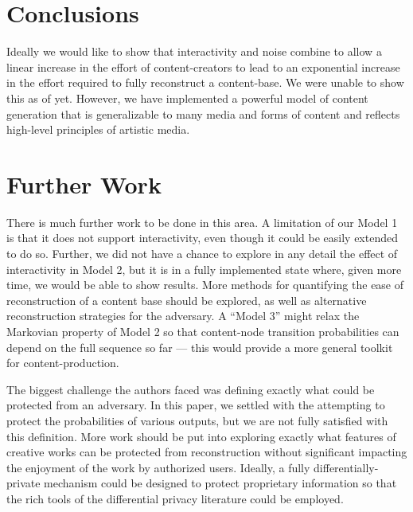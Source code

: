 \documentclass[preprint2]{aastex}
\begin{document}
\section{Conclusions}

Ideally we would like to show that interactivity and noise combine to allow a linear increase in the effort of content-creators to lead to an exponential increase in the effort required to fully reconstruct a content-base. We were unable to show this as of yet. However, we have implemented a powerful model of content generation that is generalizable to many media and forms of content and reflects high-level principles of artistic media.

\section{Further Work}

There is much further work to be done in this area. A limitation of our Model 1 is that it does not support interactivity, even though it could be easily extended to do so. Further, we did not have a chance to explore in any detail the effect of interactivity in Model 2, but it is in a fully implemented state where, given more time, we would be able to show results. More methods for quantifying the ease of reconstruction of a content base should be explored, as well as alternative reconstruction strategies for the adversary. A ``Model 3'' might relax the Markovian property of Model 2 so that content-node transition probabilities can depend on the full sequence so far --- this would provide a more general toolkit for content-production.

The biggest challenge the authors faced was defining exactly what could be protected from an adversary. In this paper, we settled with the attempting to protect the probabilities of various outputs, but we are not fully satisfied with this definition. More work should be put into exploring exactly what features of creative works can be protected from reconstruction without significant impacting the enjoyment of the work by authorized users. Ideally, a fully differentially-private mechanism could be designed to protect proprietary information so that the rich tools of the differential privacy literature could be employed.

\end{document}
